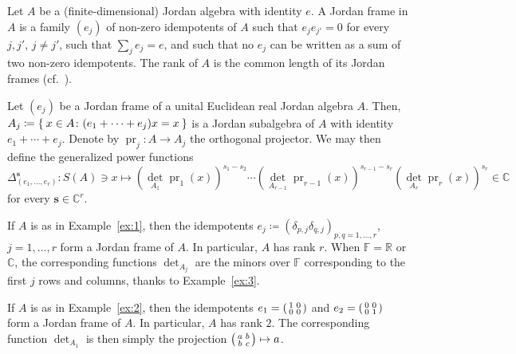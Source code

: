 \documentclass[10.5pt,reqno]{amsart}
\DeclareMathOperator{\pr}{pr}
\newcommand{\vect}[1]{\mathbf{{#1}}}
\let\originalleft\left
\let\originalright\right
\renewcommand{\left}{\mathopen{}\mathclose\bgroup\originalleft}
\renewcommand{\right}{\aftergroup\egroup\originalright}
\newcommand{\C}{\mathds{C}}
\newcommand{\R}{\mathds{R}}
\newcommand{\F}{\mathds{F}}
\begin{document}
\begin{deff}
	Let $A$ be a (finite-dimensional) Jordan algebra with identity $e$. A Jordan frame in $A$ is a  family $(e_j)$ of non-zero idempotents of $A$ such that $e_j e_{j'}=0$ for every $j,j'$, $j\neq j'$, such that $\sum_j e_j=e$, and such that no $e_j$ can be written as a sum of two non-zero idempotents. The rank of $A$ is the common length of   its Jordan frames (cf.~\cite[Theorems III.1.1 and III.1.2]{FarautKoranyi}).
\end{deff}



\begin{deff}
	Let $(e_j)$ be a Jordan frame of a unital  Euclidean  real Jordan algebra $A$. Then, $A_j\coloneqq \Set{x\in A\colon (e_1+\cdots+e_j)x=x}$ is a Jordan subalgebra of $A$ with identity $e_{1}+\cdots+e_j$. Denote by $\pr_j\colon A\to A_j$ the orthogonal projector. We may then define the generalized power functions
	\[
	\Delta_{(e_1,\dots,e_r)}^{\vect s}\colon S(A)\ni x \mapsto ({\det}_{A_1} \pr_1(x))^{s_1-s_{2}}\cdots({\det}_{A_{r-1}} \pr_{r-1}(x))^{s_{r-1}-s_r}  ({\det}_{A_r} \pr_r(x))^{s_r}\in \C
	\]
	for every $\vect s\in \C^r$.
\end{deff}

\begin{ex}\label{ex:4}
	If $A$ is as in Example~\ref{ex:1}, then the idempotents $e_j\coloneqq (\delta_{p,j}\delta_{q,j} )_{p,q=1,\dots,r}$, $j=1,\dots,r$ form a Jordan frame of $A$. In particular, $A$ has rank $r$. When $\F=\R$ or $\C$, the corresponding functions $\det_{A_j}$ are  the  minors over $\F$ corresponding to the first $j$ rows and columns, thanks to Example~\ref{ex:3}.
	
	If $A$ is as in Example~\ref{ex:2}, then the idempotents $e_1=\left(\begin{smallmatrix} 1 & 0\\ 0 & 0 \end{smallmatrix}\right)$ and $e_2=\left(\begin{smallmatrix} 0 & 0\\ 0 & 1 \end{smallmatrix}\right)$ form a Jordan frame of $A$. In particular, $A$ has rank $2$. The corresponding function $\det_{A_1}$ is then simply the projection $\left(\begin{smallmatrix} a & b\\ b & c \end{smallmatrix}\right)\mapsto a$.
\end{ex}
\end{document}
